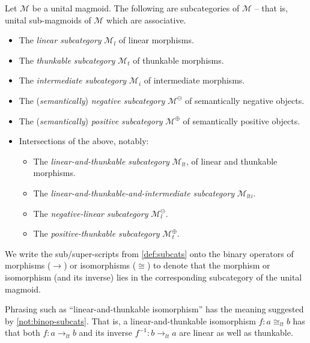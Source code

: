 \documentclass[runningheads]{llncs}
\newcommand*\rocqlogo{\usebox{\rocqlogobox}}
\newcommand{\lemmaref}[3]{\href{https://github.com/UniMath/UniMath/blob/94fae0eda57a778cec704bfa73b4ff525c9bc475/#1\#L#2?name=#3}{\rocqlogo}}
\newcommand{\acat}[1]{\mathcal{#1}}
\newcommand{\M}{\acat{M}}
\newcommand{\Cl}[1]{#1_l}
\newcommand{\Ct}[1]{#1_t}
\newcommand{\Ci}[1]{#1_i}
\newcommand{\Clt}[1]{#1_{lt}}
\newcommand{\Clti}[1]{#1_{lti}}
\newcommand{\Cn}[1]{#1^\ominus}
\newcommand{\Cp}[1]{#1^\oplus}
\newcommand{\Cnl}[1]{\Cn{\Cl{#1}}}
\newcommand{\Cpt}[1]{\Cp{\Ct{#1}}}
\begin{document}
\begin{definition}[{\lemmaref{UniMath/CategoryTheory/Nonassociative/UnitalMagmoids/PolarizedSubcategories.v}{86}{linear\_category} \cite{MunchMaccagnoni14}}]
\label{def:subcats}
Let \(\M\) be a unital magmoid. The following are subcategories of
\(\M\) -- that is, unital sub\hyp{}magmoids of \(\M\) which are associative.
\begin{itemize}
\item The \emph{linear subcategory} \(\Cl\M\) of linear morphisms.
\item The \emph{thunkable subcategory} \(\Ct\M\) of thunkable morphisms.
\item The \emph{intermediate subcategory} \(\Ci\M\) of intermediate
morphisms.
\item The (\emph{semantically}) \emph{negative subcategory} \(\Cn\M\) of semantically negative objects.
\item The (\emph{semantically}) \emph{positive subcategory} \(\Cp\M\) of semantically positive objects.
\item Intersections of the above, notably:
\begin{itemize}
\item The \emph{linear\hyp{}and\hyp{}thunkable subcategory} \(\Clt\M\), of linear
and thunkable morphisms.
\item The \emph{linear\hyp{}and\hyp{}thunkable\hyp{}and\hyp{}intermediate subcategory} \(\Clti\M\).
\item The \emph{negative\hyp{}linear subcategory} \(\Cnl\M\).
\item The \emph{positive\hyp{}thunkable subcategory} \(\Cpt\M\).
\end{itemize}
\end{itemize}
\end{definition}

\begin{notation}
\label{not:binop-subcats}
We write the sub/super\hyp{}scripts from \autoref{def:subcats} onto the binary
operators of morphisms (\(\to\)) or isomorphisms (\(\cong\)) to denote
that the morphism or isomorphism (and its inverse) lies in the
corresponding subcategory of the unital magmoid.
\end{notation}
\begin{convention}
Phrasing such as ``linear\hyp{}and\hyp{}thunkable isomorphism'' has the
meaning suggested by \autoref{not:binop-subcats}. That is, a
linear\hyp{}and\hyp{}thunkable isomorphism \(f : a \Clt\cong b\) has that both
\(f \colon a \Clt\to b\) and its inverse \(f^{-1} \colon b \Clt\to a\) are
linear as well as thunkable.
\end{convention}
\end{document}
